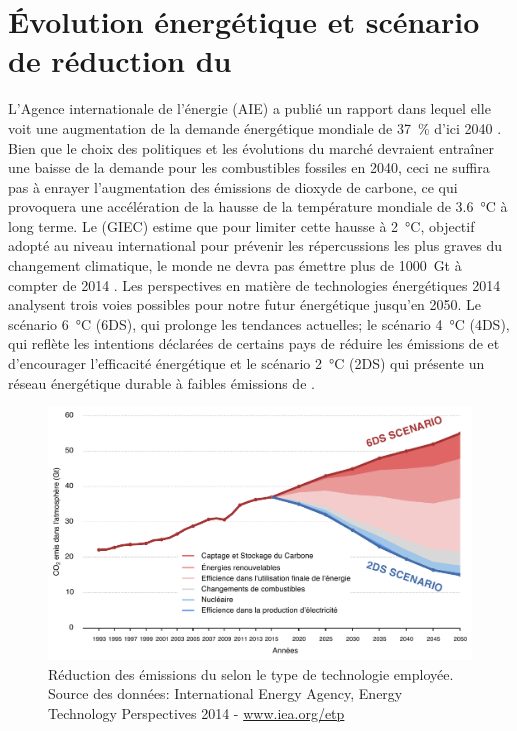 \section{Évolution énergétique et scénario de réduction du
\texorpdfstring{}{CO2}}
L'Agence internationale de l'énergie (AIE) a publié un rapport dans lequel elle
voit une augmentation de la demande énergétique mondiale de \SI{37}{\percent}
d'ici \num{2040} \citep{WEO2014}. Bien que le choix des politiques et les
évolutions du marché devraient entraîner une baisse de la demande pour les
combustibles fossiles en \num{2040}, ceci ne suffira pas à enrayer
l'augmentation des émissions de dioxyde de carbone, ce qui provoquera une
accélération de la hausse de la température mondiale de \SI{3.6}{\degreeCelsius}
à long terme. Le (GIEC) estime que pour limiter cette hausse à
\SI{2}{\degreeCelsius}, objectif
adopté au niveau international pour prévenir les répercussions les plus graves
du changement climatique, le monde ne devra pas émettre plus de
\SI{1000}{\giga\tonne}  à compter de \num{2014} \citep{WEO2014}. Les
perspectives en matière de technologies énergétiques \num{2014} \citep{ETP2014}
analysent trois voies possibles pour notre futur énergétique jusqu’en 2050. Le
scénario \SI{6}{\degreeCelsius} (6DS), qui prolonge les tendances actuelles; le
scénario \SI{4}{\degreeCelsius} (4DS), qui reflète les intentions déclarées de
certains pays de réduire les émissions de  et d'encourager l’efficacité
énergétique et le scénario \SI{2}{\degreeCelsius} (2DS) qui présente un réseau
énergétique durable à faibles émissions de .
\begin{figure}[ht]
\centering
\includegraphics[width=1\textwidth]{fig/EPT2014.pdf}
\caption{Réduction des émissions du  selon le type de technologie
employée. Source des données: International Energy Agency, Energy Technology
Perspectives 2014 - \url{www.iea.org/etp}}
\label{fig:ETP2014}
\end{figure}
